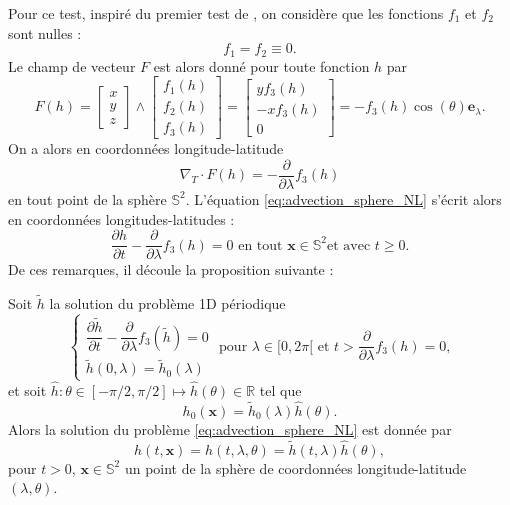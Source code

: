 Pour ce test, inspiré du premier test de \cite{BenArtzi2009}, on considère que les fonctions $f_1$ et $f_2$ sont nulles :
\begin{equation}
f_1 = f_2 \equiv 0.
\end{equation}
Le champ de vecteur $F$ est alors donné pour toute fonction $h$ par
\begin{equation}
F(h) = \begin{bmatrix}
x \\ y \\z
\end{bmatrix}
\wedge
\begin{bmatrix}
f_1(h) \\ f_2(h) \\ f_3(h)
\end{bmatrix} = \begin{bmatrix}
y f_3 (h) \\ -x f_3(h) \\ 0
\end{bmatrix} = -f_3(h) \cos (\theta) \mathbf{e}_{\lambda}.
\end{equation}
On a alors en coordonnées longitude-latitude
\begin{equation}
\nabla_T \cdot F(h) = - \dfrac{\partial}{\partial \lambda} f_3(h)
\end{equation}
en tout point de la sphère $\mathbb{S}^2$.
L'équation \eqref{eq:advection_sphere_NL} s'écrit alors en coordonnées longitudes-latitudes :
\begin{equation}
\dfrac{\partial h}{\partial t} - \dfrac{\partial}{\partial \lambda}f_3(h) = 0 \text{ en tout } \mathbf{x} \in \mathbb{S}^2 \text{et avec } t \geq 0.
\end{equation}
De ces remarques, il découle la proposition suivante :
\begin{proposition}
Soit $\tilde{h}$ la solution du problème 1D périodique 
\begin{equation}
\left\lbrace
\begin{array}{rcl}
\dfrac{\partial \tilde{h}}{\partial t} - \dfrac{\partial}{\partial \lambda}f_3(\tilde{h}) = 0 \\
\tilde{h}(0,\lambda) = \tilde{h}_0(\lambda) 
\end{array}
\right. \text{ pour } \lambda \in [0, 2 \pi[ \text{ et } t >\dfrac{\partial}{\partial \lambda}f_3(h) = 0,
\label{eq:conservation_sph_burgers}
\end{equation}
et soit $\hat{h} : \theta \in [- \pi/2, \pi/2] \mapsto \hat{h}(\theta) \in \mathbb{R}$ tel que
\begin{equation}
h_0(\mathbf{x}) = \tilde{h}_0(\lambda) \hat{h}(\theta).
\end{equation}
Alors la solution du problème \eqref{eq:advection_sphere_NL} est donnée par
\begin{equation}
h(t,\mathbf{x}) = h(t,\lambda, \theta) = \tilde{h}(t,\lambda) \hat{h}(\theta),
\end{equation}
pour $t>0$, $\mathbf{x} \in \mathbb{S}^2$ un point de la sphère de coordonnées longitude-latitude $(\lambda, \theta)$.
\end{proposition}

